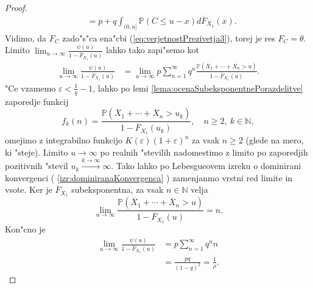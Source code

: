 \documentclass[12pt, a4paper, reqno]{amsart}
\theoremstyle{definition}
\theoremstyle{plain}
\newcommand{\N}{\mathbb{N}}
\newcommand{\Prob}{\mathbb{P}}
\newcommand{\1}{\mathds{1}}
\newcommand*{\refPriloga}[1]{%
  \begingroup
    \hypersetup{
      linkcolor=properpurple,
      linkbordercolor=properpurple,
    }%
    \ref{#1}%
  \endgroup
}
\begin{document}
\begin{proof}
\begin{align*}
                    &= p + q\int_{(0, u]}\Prob\left(C \leq u - x\right)d\overline{F}_{X_1}(x).
            \end{align*}
            Vidimo, da $F_C$ zado"s"ca ena"cbi (\ref{eq:verjetnostPrezivetja3}), torej je res $F_C = \theta$. Limito 
            $\lim_{u\to\infty}\frac{\psi(u)}{1 - \overline{F}_{X_1}(u)}$ lahko tako zapi"semo kot
            \begin{align*}
                \lim_{u\to\infty}\frac{\psi(u)}{1 - \overline{F}_{X_1}(u)}   &= \lim_{u\to\infty}p\sum_{n=1}^{\infty}q^n\frac{\Prob\left(\overline{X}_1 + \cdots +\overline{X}_n > u\right)}{1 - \overline{F}_{X_1}(u)}.
            \end{align*}
            "Ce vzamemo $\varepsilon < \frac{1}{q} - 1$, lahko po lemi \ref{lema:ocenaSubeksponentnePorazdelitve} zaporedje funkcij 
            \begin{equation*}
                f_k(n) = \frac{\Prob\left(\overline{X}_1 + \cdots +\overline{X}_n > u_k\right)}{1 - \overline{F}_{X_1}(u_k)}, \quad n\geq 2,\ k\in\N, 
            \end{equation*}
            omejimo z integrabilno funkcijo $K(\varepsilon)(1 + \varepsilon)^n$ za vsak $n\geq 2$ (glede na mero, ki "steje). Limito $u\to\infty$ po 
            realnih "stevilih nadomestimo z limito po zaporedjih pozitivnih "stevil $u_k\xrightarrow{k\to\infty}\infty$.
            Tako lahko po Lebesgueovem izreku o dominirani konvergenci (\refPriloga{izr:dominiranaKonvergenca})
            zamenjanmo vrstni red limite in vsote.
            Ker je $\overline{F}_{X_1}$ subeksponentna, za vsak $n\in\N$ velja
            \begin{equation*}
                \lim_{u\to\infty}\frac{\Prob\left(\overline{X}_1 + \cdots +\overline{X}_n > u\right)}{1 - \overline{F}_{X_1}(u)} = n.
            \end{equation*}
            Kon"cno je
            \begin{align*}
                \lim_{u\to\infty}\frac{\psi(u)}{1 - \overline{F}_{X_1}(u)} &= p\sum_{n=1}^\infty q^nn \\
                                 &= \frac{pq}{(1 - q)^2} =  \frac{1}{\rho}.
            \end{align*}
        \end{proof}
\end{document}
